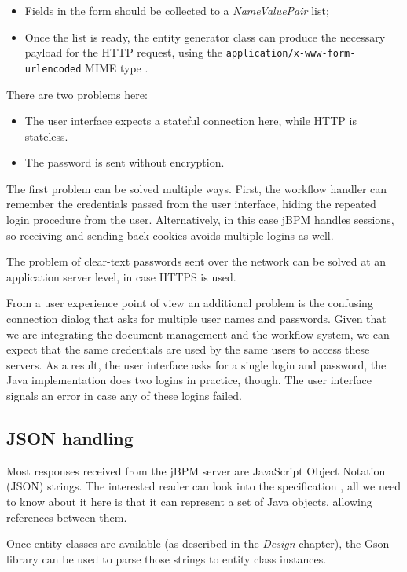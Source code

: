 \begin{itemize}
\item Fields in the form should be collected to a \emph{NameValuePair} list;
\item Once the list is ready, the entity generator class can produce the
necessary payload for the HTTP request, using the
\texttt{application/x-www-form-urlencoded} MIME type \cite{form-encoding}.
\end{itemize}

There are two problems here:

\begin{itemize}
\item The user interface expects a stateful connection here, while HTTP is stateless.
\item The password is sent without encryption.
\end{itemize}

The first problem can be solved multiple ways. First, the workflow handler can
remember the credentials passed from the user interface, hiding the repeated
login procedure from the user. Alternatively, in this case jBPM handles
sessions, so receiving and sending back cookies avoids multiple logins as well.

The problem of clear-text passwords sent over the network can be solved at an
application server level, in case HTTPS is used.

From a user experience point of view an additional problem is the confusing
connection dialog that asks for multiple user names and passwords. Given that
we are integrating the document management and the workflow system, we can
expect that the same credentials are used by the same users to access these
servers. As a result, the user interface asks for a single login and password,
the Java implementation does two logins in practice, though. The user interface
signals an error in case any of these logins failed.

\subsection{JSON handling}

Most responses received from the jBPM server are JavaScript Object Notation
(JSON) strings. The interested reader can look into the
specification \cite{json}, all we need to know about it here is that it can
represent a set of Java objects, allowing references between them.

Once entity classes are available (as described in the \emph{Design} chapter),
the Gson library \cite{gson} can be used to parse those strings to entity class
instances.

